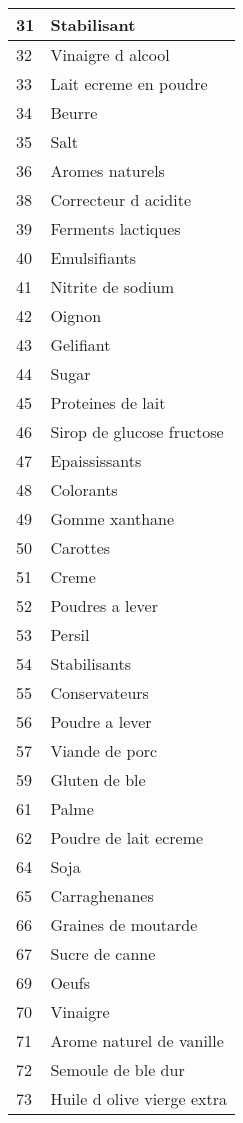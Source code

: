 \begin{longtable}{|l|l|}
31 & Stabilisant \\ \hline 
32 & Vinaigre d alcool \\ \hline 
33 & Lait ecreme en poudre \\ \hline 
34 & Beurre \\ \hline 
35 & Salt \\ \hline 
36 & Aromes naturels \\ \hline 
38 & Correcteur d acidite \\ \hline 
39 & Ferments lactiques \\ \hline 
40 & Emulsifiants \\ \hline 
41 & Nitrite de sodium \\ \hline 
42 & Oignon \\ \hline 
43 & Gelifiant \\ \hline 
44 & Sugar \\ \hline 
45 & Proteines de lait \\ \hline 
46 & Sirop de glucose fructose \\ \hline 
47 & Epaississants \\ \hline 
48 & Colorants \\ \hline 
49 & Gomme xanthane \\ \hline 
50 & Carottes \\ \hline 
51 & Creme \\ \hline 
52 & Poudres a lever \\ \hline 
53 & Persil \\ \hline 
54 & Stabilisants \\ \hline 
55 & Conservateurs \\ \hline 
56 & Poudre a lever \\ \hline 
57 & Viande de porc \\ \hline 
59 & Gluten de ble \\ \hline 
61 & Palme \\ \hline 
62 & Poudre de lait ecreme \\ \hline 
64 & Soja \\ \hline 
65 & Carraghenanes \\ \hline 
66 & Graines de moutarde \\ \hline 
67 & Sucre de canne \\ \hline 
69 & Oeufs \\ \hline 
70 & Vinaigre \\ \hline 
71 & Arome naturel de vanille \\ \hline 
72 & Semoule de ble dur \\ \hline 
73 & Huile d olive vierge extra \\ \hline 

\end{longtable}
